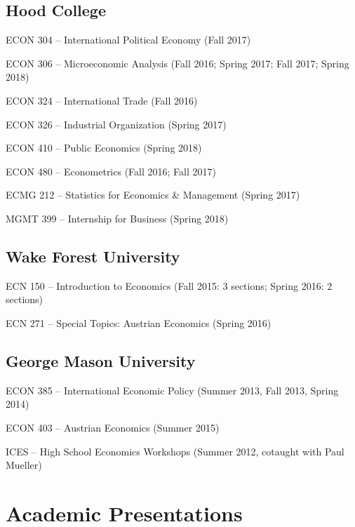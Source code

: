 \documentclass[]{article}
\renewenvironment{itemize}{
  \begin{list}{}{
    \setlength{\leftmargin}{1.5em}
  }
}{
  \end{list}
}
\begin{document}
\subsection*{Hood College}\begin{itemize}
    \item ECON 304 -- International Political Economy (Fall 2017) 
    \item ECON 306 -- Microeconomic Analysis (Fall 2016; Spring 2017; Fall 2017; Spring 2018)
    \item ECON 324 -- International Trade (Fall 2016)
    \item ECON 326 -- Industrial Organization (Spring 2017)
    \item ECON 410 -- Public Economics (Spring 2018)
    \item ECON 480 -- Econometrics (Fall 2016; Fall 2017)
    \item ECMG 212 -- Statistics for Economics \& Management (Spring 2017)
    \item MGMT 399 -- Internship for Business (Spring 2018) 
\end{itemize}

\subsection*{Wake Forest University}\begin{itemize}
    \item ECN 150 -- Introduction to Economics (Fall 2015: 3 sections; Spring 2016: 2 sections) 
    \item ECN 271 -- Special Topics: Austrian Economics (Spring 2016) 
\end{itemize}

\subsection*{George Mason University}\begin{itemize}
    \item ECON 385 --  International Economic Policy (Summer 2013, Fall 2013, Spring 2014)
    \item ECON 403 -- Austrian Economics (Summer 2015)
    \item ICES -- High School Economics Workshops (Summer 2012, cotaught with Paul Mueller)
\end{itemize}

\section*{Academic Presentations}
\end{document}
